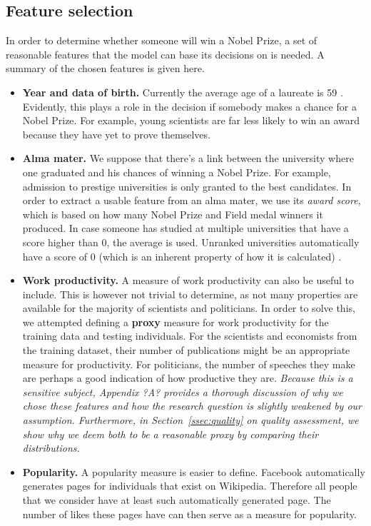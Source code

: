 \subsection{Feature selection}
\label{ssec:features}
In order to determine whether someone will win a Nobel Prize, a set of reasonable features that the model can base its decisions on is needed. A summary of the chosen features is given here. 
\begin{itemize}
\item \textbf{Year and data of birth.}
Currently the average age of a laureate is 59 \cite{age}. Evidently, this plays a role in the decision if somebody makes a chance for a Nobel Prize. For example, young scientists are far less likely to win an award because they have yet to prove themselves.
\item \textbf{Alma mater.} We suppose that there's a link between the university where one graduated and his chances of winning a Nobel Prize. For example, admission to prestige universities is only granted to the best candidates. In order to extract a usable feature from an alma mater, we use its \emph{award score}, which is based on how many Nobel Prize and Field medal winners it produced. In case someone has studied at multiple universities that have a score higher than 0, the average is used. Unranked universities automatically have a score of 0 (which is an inherent property of how it is calculated) .
\item \textbf{Work productivity.} A measure of work productivity can also be useful to include. This is however not trivial to determine, as not many properties are available for the majority of scientists and politicians. In order to solve this, we attempted defining a \textbf{proxy} measure for work productivity for the training data and testing individuals. For the scientists and economists from the training dataset, their number of publications might be an appropriate measure for productivity. For politicians, the number of speeches they make are perhaps a good indication of how productive they are. \emph{Because this is a sensitive subject, Appendix ?A? provides a thorough discussion of why we chose these features and how the research question is slightly weakened by our assumption. Furthermore, in Section~\ref{ssec:quality} on quality assessment, we show why we deem both to be a reasonable proxy by comparing their distributions.}
\item \textbf{Popularity.} A popularity measure is easier to define. Facebook automatically generates pages for individuals that exist on Wikipedia. Therefore all people that we consider have at least such automatically generated page. The number of likes these pages have can then serve as a measure for popularity. 
\end{itemize}

